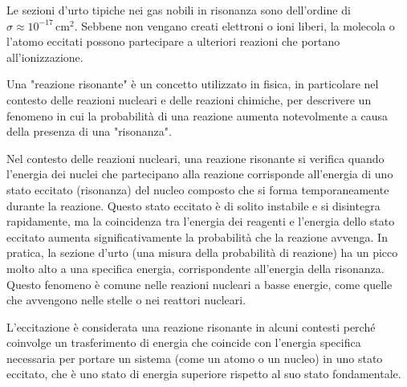 Le sezioni d'urto tipiche nei gas nobili in risonanza sono dell'ordine di $\sigma \approx 10^{-17} \, \text{cm}^2$. Sebbene non vengano creati elettroni o ioni liberi, la molecola o l'atomo eccitati possono partecipare a ulteriori reazioni che portano all'ionizzazione.

\begin{approfondimento}
   \footnotesize
   Una "reazione risonante" è un concetto utilizzato in fisica, in particolare nel contesto delle reazioni nucleari e delle reazioni chimiche, per descrivere un fenomeno in cui la probabilità di una reazione aumenta notevolmente a causa della presenza di una "risonanza".
   
   Nel contesto delle reazioni nucleari, una reazione risonante si verifica quando l'energia dei nuclei che partecipano alla reazione corrisponde all'energia di uno stato eccitato (risonanza) del nucleo composto che si forma temporaneamente durante la reazione. Questo stato eccitato è di solito instabile e si disintegra rapidamente, ma la coincidenza tra l'energia dei reagenti e l'energia dello stato eccitato aumenta significativamente la probabilità che la reazione avvenga. In pratica, la sezione d'urto (una misura della probabilità di reazione) ha un picco molto alto a una specifica energia, corrispondente all'energia della risonanza. Questo fenomeno è comune nelle reazioni nucleari a basse energie, come quelle che avvengono nelle stelle o nei reattori nucleari.

   L'eccitazione è considerata una reazione risonante in alcuni contesti perché coinvolge un trasferimento di energia che coincide con l'energia specifica necessaria per portare un sistema (come un atomo o un nucleo) in uno stato eccitato, che è uno stato di energia superiore rispetto al suo stato fondamentale.


\end{approfondimento}
